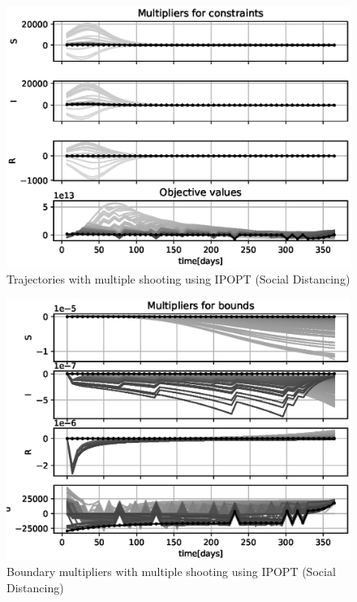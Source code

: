 \begin{figure}[H]
    \centering
    \includegraphics[width=.8\textwidth]{pythonProject/Figures/Multiple_Shooting_obj_con_IPOPT_traj_initial_Social_Distancing.eps}
    \caption{Trajectories with multiple shooting using IPOPT (Social Distancing)}
    \label{fig:MS_Traj_SD_IPOPT}
\end{figure}

\begin{figure}[H]
    \centering
    \includegraphics[width=.8\textwidth]{pythonProject/Figures/Multiple_Shooting_bounds_IPOPT_traj_initial_Social_Distancing.eps}
    \caption{Boundary multipliers with multiple shooting using IPOPT (Social Distancing)}
    \label{fig:MS_Bounds_SD_IPOPT}
\end{figure}


